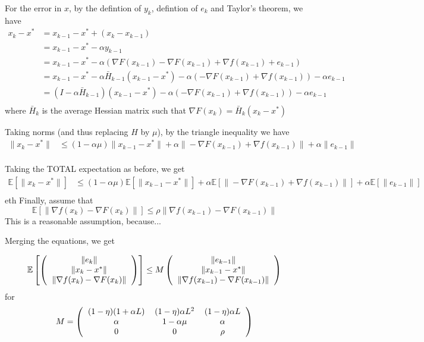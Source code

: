 \documentclass[11pt]{article}
\begin{document}
	For the error in $x$, by the defintion of $y_k$, defintion of $e_k$ and Taylor's theorem, we have 
	\begin{align*}
		x_k - x^* & = x_{k-1} - x^* + (x_k - x_{k-1})  \\
		          & = x_{k-1} - x^* - \alpha y_{k-1} \\
		          & = x_{k-1} - x^* - \alpha ( \nabla F (x_{k-1}) -  \nabla F (x_{k-1})+\nabla f(x_{k-1}) + e_{k-1} ) \\
		          & = x_{k-1} - x^* - \alpha \bar{H}_{k-1}( x_{k-1} - x^*)-  \alpha( -\nabla F (x_{k-1}) + \nabla f(x_{k-1})) - \alpha e_{k-1}  \\
		          & = (I -\alpha \bar{H}_{k-1})( x_{k-1} - x^*) -  \alpha( -\nabla F (x_{k-1}) + \nabla f(x_{k-1})) - \alpha e_{k-1}  \\
	\end{align*} 
	where $\bar{H}_{k}$ is the average Hessian matrix such that $\nabla F(x_k) =\bar{H}_{k} (x_k - x^*) $
	
	Taking norms (and thus replacing $H$ by $\mu$), by the triangle inequality we have 
	\begin{align*}
		\|x_k - x^* \|& \leq (1 -\alpha\mu) \|x_{k-1} - x^* \|+   \alpha \| -\nabla F (x_{k-1}) + \nabla f(x_{k-1}) \| +  \alpha \| e_{k-1}  \| \\
	\end{align*} 
	
	Taking the TOTAL expectation as before, we get
	\begin{align*}
		\mathbb{E} [\|x_k - x^* \| ]& \leq (1 -\alpha \mu) \mathbb{E} [\|x_{k-1} - x^* \|]+   \alpha \mathbb{E} [\| -\nabla F (x_{k-1}) + \nabla f(x_{k-1}) \| ]+  \alpha \mathbb{E} [ \| e_{k-1}  \|] \\
	\end{align*}
	eth
	Finally, assume that 
	\begin{equation}
		\mathbb{E} [\| \nabla f(x_{k}) - \nabla F (x_{k})\| ]\leq \rho \| \nabla f(x_{k-1}) - \nabla F (x_{k-1})\|
	\end{equation}
	This is a reasonable assumption, because...
	
	Merging the equations, we get 
	
	\[
		\mathbb{E} \left[ \left(  \begin{tabular}{c}
		$\| e_k \|$\\
		$\|x_k - x^* \|$\\
		$\| \nabla f(x_{k}) - \nabla F (x_{k})\|$
		\end{tabular}
		\right) \right] \leq M \left(  \begin{tabular}{c}
		$\|e_{k-1}\|$\\
		$\|x_{k-1} - x^*\|$\\
		$\| \nabla f(x_{k-1}) - \nabla F (x_{k-1})\|$
		\end{tabular}
		\right) 
	\]
	for 
	\[	M =  	\left(  \begin{tabular}{ccc}
		$(1-\eta)(1+\alpha L)$ & $(1-\eta)\alpha L^2 $& $(1- \eta)\alpha L$ \\
		$\alpha$ &$ 1 -\alpha \mu$ & $\alpha$\\
		0 & 0 & $\rho$
		\end{tabular} \right)
	\]
	
\end{document}

